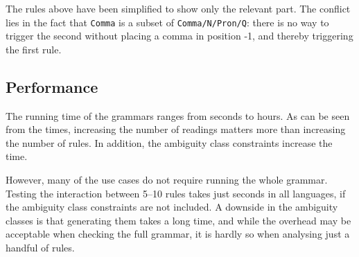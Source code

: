 The rules above have been simplified to show only the relevant part.
The conflict lies in the fact that \texttt{Comma} is a subset of \texttt{Comma/N/Pron/Q}:
there is no way to trigger the second without placing a comma in position -1, and thereby triggering the first rule.










\subsection{Performance} 
The running time of the grammars ranges from seconds to hours. 
As can be seen from the times, increasing the number of readings
matters more than increasing the number of rules.
In addition, the ambiguity class constraints increase the time.


However, many of the use cases do not require running the whole
grammar. Testing the interaction between 5--10 rules takes just
seconds in all languages, if the ambiguity class constraints are not included. 
A downside in the ambiguity classes is that generating them takes a long time, 
and while the overhead may be acceptable when checking the full grammar,
it is hardly so when analysing just a handful of rules.


